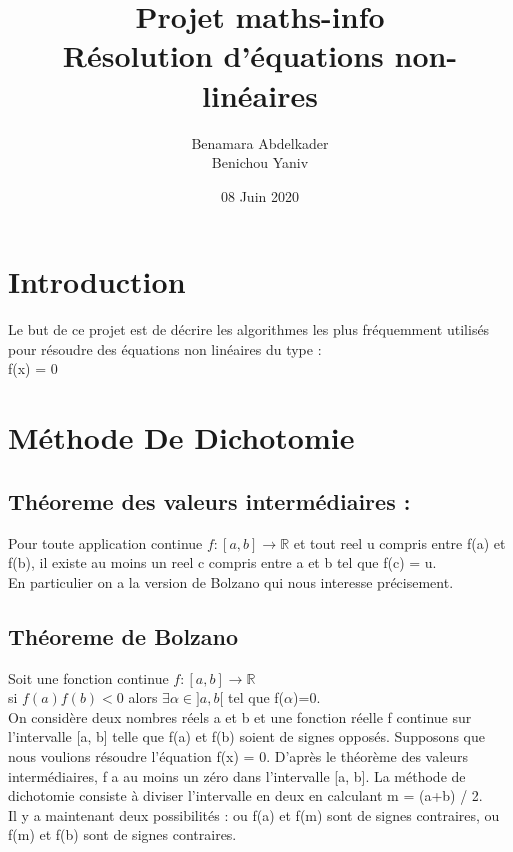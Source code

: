 \documentclass{article}
\author{Benamara Abdelkader \\ Benichou Yaniv }
\date{08 Juin 2020}
\newcommand{\R}{\mathbb{R}}
\begin{document}
\title{Projet maths-info \\ 
Résolution d'équations non-linéaires}
\maketitle

\newpage
\tableofcontents
\newpage

\section{Introduction}
    Le but de ce projet est de décrire les algorithmes les plus fréquemment utilisés pour résoudre des équations non linéaires du type : \\ f(x) = 0
                         
\newpage


\section{Méthode De Dichotomie}
\subsection{Théoreme des valeurs intermédiaires :}
Pour toute application continue $ f : [a, b] \to \R $ et tout reel u compris entre f(a) et f(b), il existe au moins un reel c compris entre a et b tel que f(c) = u. \\
En particulier on a la version de Bolzano qui nous interesse précisement.

\subsection{Théoreme de Bolzano}
Soit une fonction continue $ f : [a, b] \to \R $ \\
si $ f(a)f(b) < 0 $  alors $ \exists \alpha \in  ]a, b[ $ tel que f($\alpha$)=0. \\ 


On considère deux nombres réels a et b et une fonction réelle f continue sur l'intervalle [a, b] telle que f(a) et f(b) soient de signes opposés. Supposons que nous voulions résoudre l'équation f(x) = 0. D'après le théorème des valeurs intermédiaires, f a au moins un zéro dans l’intervalle [a, b]. La méthode de dichotomie consiste à diviser l’intervalle en deux en calculant m = (a+b) / 2. \\
Il y a maintenant deux possibilités : ou f(a) et f(m) sont de signes contraires, ou f(m) et f(b) sont de signes contraires.
\end{document}
